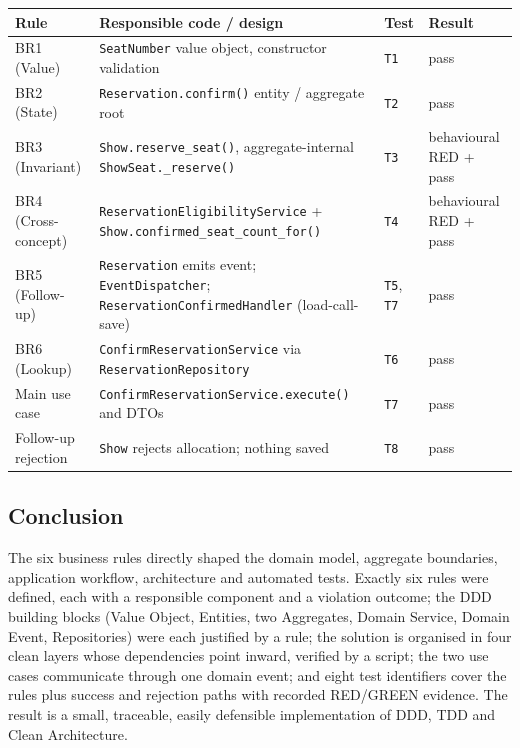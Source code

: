 \documentclass[11pt,a4paper]{article}
\newcommand{\code}[1]{\texttt{#1}}
\begin{document}
\begin{center}
  \scriptsize
  \begin{tabularx}{\textwidth}{@{}l X l l@{}}
    \toprule
    \textbf{Rule} & \textbf{Responsible code / design} & \textbf{Test} & \textbf{Result} \\
    \midrule
    BR1 (Value) & \code{SeatNumber} value object, constructor validation &
      \code{T1} & pass \\
    BR2 (State) & \code{Reservation.confirm()} entity / aggregate root &
      \code{T2} & pass \\
    BR3 (Invariant) & \code{Show.reserve\_seat()}, aggregate-internal
      \code{ShowSeat.\_reserve()} & \code{T3} & behavioural RED + pass \\
    BR4 (Cross-concept) & \code{ReservationEligibilityService} + 
      \code{Show.confirmed\_seat\_count\_for()} & \code{T4} & behavioural RED + pass \\
    BR5 (Follow-up) & \code{Reservation} emits event; \code{EventDispatcher};
      \code{ReservationConfirmedHandler} (load-call-save) & \code{T5}, \code{T7} & pass \\
    BR6 (Lookup) & \code{ConfirmReservationService} via
      \code{ReservationRepository} & \code{T6} & pass \\
    Main use case & \code{ConfirmReservationService.execute()} and DTOs &
      \code{T7} & pass \\
    Follow-up rejection & \code{Show} rejects allocation; nothing saved &
      \code{T8} & pass \\
    \bottomrule
  \end{tabularx}
\end{center}

\subsection{Conclusion}

The six business rules directly shaped the domain model, aggregate boundaries,
application workflow, architecture and automated tests. Exactly six rules were
defined, each with a responsible component and a violation outcome; the DDD
building blocks (Value Object, Entities, two Aggregates, Domain Service, Domain
Event, Repositories) were each justified by a rule; the solution is organised in
four clean layers whose dependencies point inward, verified by a script; the two
use cases communicate through one domain event; and eight test identifiers cover
the rules plus success and rejection paths with recorded RED/GREEN evidence.
The result is a small, traceable, easily defensible implementation of DDD, TDD
and Clean Architecture.
\end{document}
